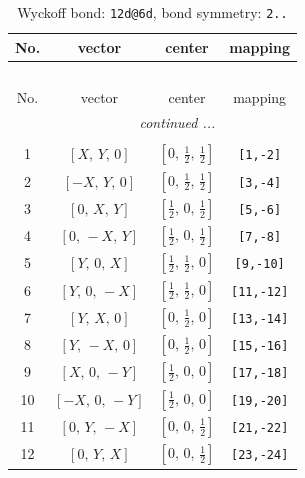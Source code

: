 \documentclass[fleqn,8pt]{jsarticle}
\begin{document}
\begin{longtable}{cccc}
\caption{Wyckoff bond: {\tt 12d@6d}, bond symmetry: {\tt 2..}}
 \\
 \hline \hline
No. & vector & center & mapping \\ \hline \endfirsthead

\multicolumn{3}{l}{\tablename\ \thetable{}} \\
 \hline \hline
No. & vector & center & mapping \\ \hline \endhead

 \hline \hline
\multicolumn{3}{r}{\footnotesize\it continued ...} \\ \endfoot

 \hline \hline
\multicolumn{3}{r}{} \\ \endlastfoot

1 & $\left[ X,\, Y,\, 0 \right]$ & $\left[ 0,\, \frac{1}{2},\, \frac{1}{2} \right]$ & {\tt [1,-2]} \\ \hline
2 & $\left[ - X,\, Y,\, 0 \right]$ & $\left[ 0,\, \frac{1}{2},\, \frac{1}{2} \right]$ & {\tt [3,-4]} \\ \hline
3 & $\left[ 0,\, X,\, Y \right]$ & $\left[ \frac{1}{2},\, 0,\, \frac{1}{2} \right]$ & {\tt [5,-6]} \\ \hline
4 & $\left[ 0,\, - X,\, Y \right]$ & $\left[ \frac{1}{2},\, 0,\, \frac{1}{2} \right]$ & {\tt [7,-8]} \\ \hline
5 & $\left[ Y,\, 0,\, X \right]$ & $\left[ \frac{1}{2},\, \frac{1}{2},\, 0 \right]$ & {\tt [9,-10]} \\ \hline
6 & $\left[ Y,\, 0,\, - X \right]$ & $\left[ \frac{1}{2},\, \frac{1}{2},\, 0 \right]$ & {\tt [11,-12]} \\ \hline
7 & $\left[ Y,\, X,\, 0 \right]$ & $\left[ 0,\, \frac{1}{2},\, 0 \right]$ & {\tt [13,-14]} \\ \hline
8 & $\left[ Y,\, - X,\, 0 \right]$ & $\left[ 0,\, \frac{1}{2},\, 0 \right]$ & {\tt [15,-16]} \\ \hline
9 & $\left[ X,\, 0,\, - Y \right]$ & $\left[ \frac{1}{2},\, 0,\, 0 \right]$ & {\tt [17,-18]} \\ \hline
10 & $\left[ - X,\, 0,\, - Y \right]$ & $\left[ \frac{1}{2},\, 0,\, 0 \right]$ & {\tt [19,-20]} \\ \hline
11 & $\left[ 0,\, Y,\, - X \right]$ & $\left[ 0,\, 0,\, \frac{1}{2} \right]$ & {\tt [21,-22]} \\ \hline
12 & $\left[ 0,\, Y,\, X \right]$ & $\left[ 0,\, 0,\, \frac{1}{2} \right]$ & {\tt [23,-24]} \\
\end{longtable}
\end{document}
